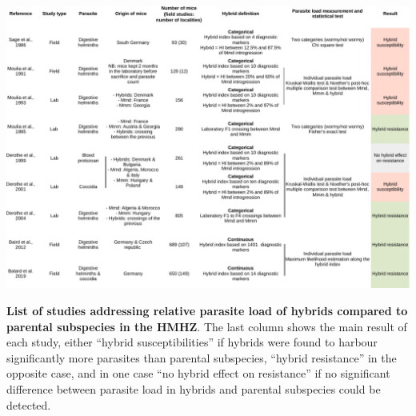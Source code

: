 \begin{landscape}
\begin{table}
	\centering
	\includegraphics[width=\linewidth,height=\textheight,keepaspectratio]{images/4discussion/Table1.pdf}
	\caption{\textbf{List of studies addressing relative parasite load of hybrids compared to parental subspecies in the HMHZ}. The last column shows the main result of each study, either “hybrid susceptibilities” if hybrids were found to harbour significantly more parasites than parental subspecies, “hybrid resistance” in the opposite case, and in one case “no hybrid effect on resistance” if no significant difference between parasite load in hybrids and parental subspecies could be detected.}
\end{table}
\end{landscape}

